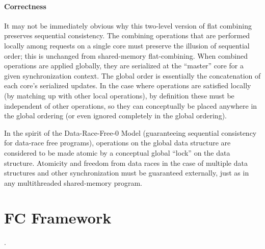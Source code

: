 \paragraph{Correctness}

It may not be immediately obvious why this two-level version of flat combining preserves sequential consistency. The combining operations that are performed locally among requests on a single core must preserve the illusion of sequential order; this is unchanged from shared-memory flat-combining. When combined operations are applied globally, they are serialized at the ``master'' core for a given synchronization context. The global order is essentially the concatenation of each core's serialized updates. In the case where operations are satisfied locally (by matching up with other local operations), by definition these must be independent of other operations, so they can conceptually be placed anywhere in the global ordering (or even ignored completely in the global ordering).

In the spirit of the Data-Race-Free-0 Model (guaranteeing sequential consistency for data-race free programs), operations on the global data structure are considered to be made atomic by a conceptual global ``lock'' on the data structure. Atomicity and freedom from data races in the case of multiple data structures and other synchronization must be guaranteed externally, just as in any multithreaded shared-memory program.

\section{FC Framework}
.

